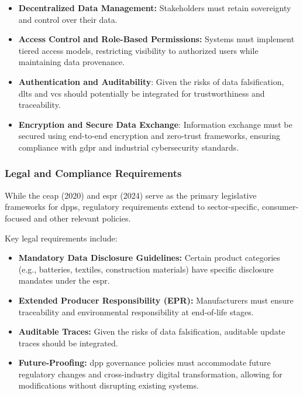 \begin{itemize}[itemsep=0.5\baselineskip]
    \item \textbf{Decentralized Data Management:} Stakeholders must retain sovereignty and control over their data. \autocite{Jansen.2023}

    \item \textbf{Access Control and Role-Based Permissions:} Systems must implement tiered access models, restricting visibility to authorized users while maintaining data provenance. \autocite{Berg.2022}

    \item \textbf{Authentication and Auditability}: Given the risks of data falsification, \ac{dlt}s and \ac{vc}s should potentially be integrated for trustworthiness and traceability. \autocite{GS1inEurope.2025}

    \item \textbf{Encryption and Secure Data Exchange}: Information exchange must be secured using end-to-end encryption and zero-trust frameworks, ensuring compliance with \ac{gdpr} and industrial cybersecurity standards. \autocite{Heemskerk.2025, EuropeanParliamentandCouncil.2016}
\end{itemize}

\subsubsection*{Legal and Compliance Requirements}
While the \ac{ceap} (2020) and \ac{espr} (2024) serve as the primary legislative frameworks for \ac{dpp}s, regulatory requirements extend to sector-specific, consumer-focused and other relevant policies.

Key legal requirements include:

\begin{itemize}[itemsep=0.5\baselineskip]
    \item \textbf{Mandatory Data Disclosure Guidelines:} Certain product categories (e.g., batteries, textiles, construction materials) have specific disclosure mandates under the \ac{espr}. \autocite{EuropeanParliamentandCouncil.2024}

    \item \textbf{Extended Producer Responsibility (EPR):} Manufacturers must ensure traceability and environmental responsibility at end-of-life stages. \autocite{Urban.2024}

    \item \textbf{Auditable Traces:} Given the risks of data falsification, auditable update traces should be integrated. \autocite{GS1inEurope.2025}

    \item \textbf{Future-Proofing:} \ac{dpp} governance policies must accommodate future regulatory changes and cross-industry digital transformation, allowing for modifications without disrupting existing systems. \autocite{Heemskerk.2025}
\end{itemize}

